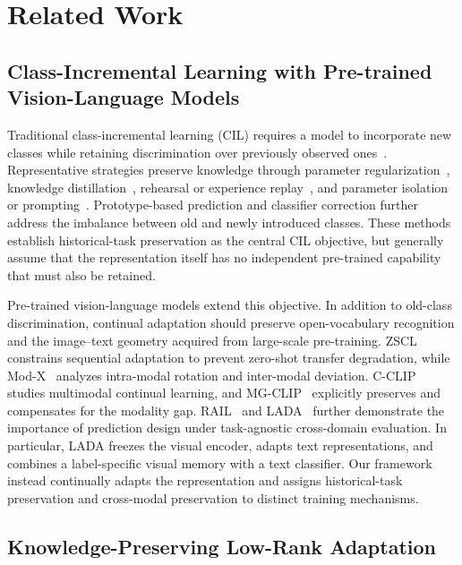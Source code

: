 \section{Related Work}
\label{sec:related}

\subsection{Class-Incremental Learning with Pre-trained Vision-Language Models}

Traditional class-incremental learning (CIL) requires a model to incorporate new classes while retaining discrimination over previously observed ones~\cite{de2021continual,wang2024b}. Representative strategies preserve knowledge through parameter regularization~\cite{kirkpatrick2017overcoming,ahn2019uncertainty}, knowledge distillation~\cite{li2017learning}, rehearsal or experience replay~\cite{rebuffi2017icarl,rolnick2019experience}, and parameter isolation or prompting~\cite{wang2022learning,wang2022dualprompt}. Prototype-based prediction and classifier correction further address the imbalance between old and newly introduced classes. These methods establish historical-task preservation as the central CIL objective, but generally assume that the representation itself has no independent pre-trained capability that must also be retained.

Pre-trained vision-language models extend this objective. In addition to old-class discrimination, continual adaptation should preserve open-vocabulary recognition and the image--text geometry acquired from large-scale pre-training. ZSCL~\cite{zheng2023zscl} constrains sequential adaptation to prevent zero-shot transfer degradation, while Mod-X~\cite{ni2023modx} analyzes intra-modal rotation and inter-modal deviation. C-CLIP~\cite{liu2025cclip} studies multimodal continual learning, and MG-CLIP~\cite{huang2025mgclip} explicitly preserves and compensates for the modality gap. RAIL~\cite{xu2024rail} and LADA~\cite{luo2025lada} further demonstrate the importance of prediction design under task-agnostic cross-domain evaluation. In particular, LADA freezes the visual encoder, adapts text representations, and combines a label-specific visual memory with a text classifier. Our framework instead continually adapts the representation and assigns historical-task preservation and cross-modal preservation to distinct training mechanisms.

\subsection{Knowledge-Preserving Low-Rank Adaptation}

